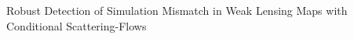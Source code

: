 \documentclass[]{article}
\begin{document}
Robust Detection of Simulation Mismatch in Weak Lensing Maps with Conditional Scattering-Flows
\end{document}
